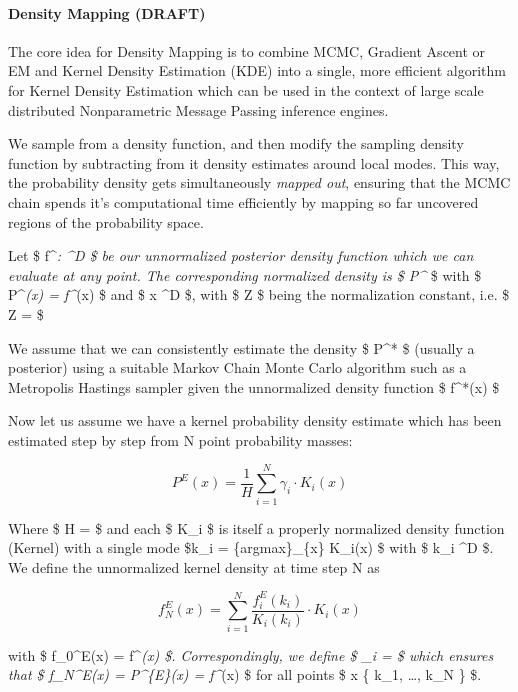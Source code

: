 \paragraph{Density Mapping (DRAFT)}

The core idea for Density Mapping is to combine MCMC, Gradient Ascent or
EM and Kernel Density Estimation (KDE) into a single, more efficient
algorithm for Kernel Density Estimation which can be used in the context
of large scale distributed Nonparametric Message Passing inference
engines.

We sample from a density function, and then modify the sampling density
function by subtracting from it density estimates around local modes.
This way, the probability density gets simultaneously \emph{mapped out},
ensuring that the MCMC chain spends it's computational time efficiently
by mapping so far uncovered regions of the probability space.

Let \$ f\^{}\emph{: \^{}D \mapsto {} \$ be our
unnormalized posterior density function which we can evaluate at any
point. The corresponding normalized density is \$ P\^{}} \$ with \$
P\^{}\emph{(x) =  f\^{}}(x) \$ and \$ x \in
{}\^{}D \$, with \$ Z \$ being the normalization constant, i.e.
\$ Z =  \$

We assume that we can consistently estimate the density \$ P\^{}* \$
(usually a posterior) using a suitable Markov Chain Monte Carlo
algorithm such as a Metropolis Hastings sampler given the unnormalized
density function \$ f\^{}*(x) \$

Now let us assume we have a kernel probability density estimate which
has been estimated step by step from N point probability masses:

\[
P^{E}(x) = \frac{1}{H} \sum_{i=1}^{N} \gamma_i \cdot K_i(x)
\]

Where \$ H =  \$ and each \$ K\_i \$ is itself a properly
normalized density function (Kernel) with a single mode \$k\_i =
\{argmax\}\_\{x\} K\_i(x) \$ with \$ k\_i \in {}\^{}D \$. We
define the unnormalized kernel density at time step N as

\[
f_N^E(x) =  \sum_{i=1}^{N} \frac{f_i^E(k_i)}{K_i(k_i)} \cdot K_i(x)
\]

with \$ f\_0\^{}E(x) = f\^{}\emph{(x) \$. Correspondingly, we define \$
\gamma\_i =  \$ which ensures that \$
f\_N\^{}E(x) = P\^{}\{E\}(x) = f\^{}}(x) \$ for all points \$ x \in \{
k\_1, \ldots, k\_N \} \$.

